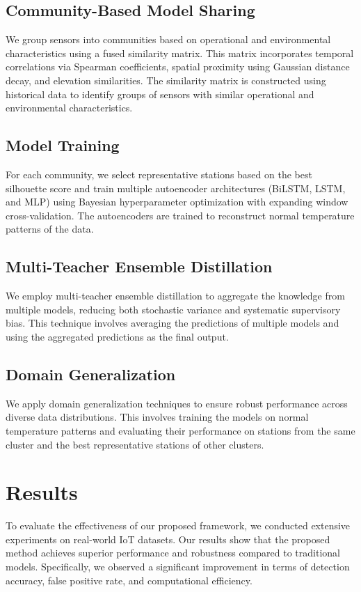 \subsection{Community-Based Model Sharing}
We group sensors into communities based on operational and environmental characteristics using a fused similarity matrix. This matrix incorporates temporal correlations via Spearman coefficients, spatial proximity using Gaussian distance decay, and elevation similarities. The similarity matrix is constructed using historical data to identify groups of sensors with similar operational and environmental characteristics.

\subsection{Model Training}
For each community, we select representative stations based on the best silhouette score and train multiple autoencoder architectures (BiLSTM, LSTM, and MLP) using Bayesian hyperparameter optimization with expanding window cross-validation. The autoencoders are trained to reconstruct normal temperature patterns of the data.

\subsection{Multi-Teacher Ensemble Distillation}
We employ multi-teacher ensemble distillation to aggregate the knowledge from multiple models, reducing both stochastic variance and systematic supervisory bias. This technique involves averaging the predictions of multiple models and using the aggregated predictions as the final output.

\subsection{Domain Generalization}
We apply domain generalization techniques to ensure robust performance across diverse data distributions. This involves training the models on normal temperature patterns and evaluating their performance on stations from the same cluster and the best representative stations of other clusters.

\section{Results}
To evaluate the effectiveness of our proposed framework, we conducted extensive experiments on real-world IoT datasets. Our results show that the proposed method achieves superior performance and robustness compared to traditional models. Specifically, we observed a significant improvement in terms of detection accuracy, false positive rate, and computational efficiency.

